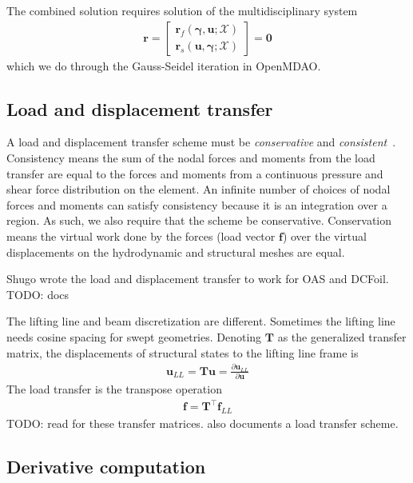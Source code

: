 \documentclass[10pt]{article}
\newcommand{\pp}[2]{\frac{\partial #1}{\partial #2}}
\newcommand{\mb}[1]{\boldsymbol{\mathbf{#1}}} %
\newcommand{\mbf}[1]{\mathbf{#1}}
\newcommand{\mbs}[1]{\boldsymbol{#1}}
\newcommand{\mcal}[1]{\mathcal{#1}} %
\newcommand{\beq}{\begin{equation}\begin{aligned}}
\newcommand{\eeq}{\end{aligned}\end{equation}}
\begin{document}
The combined solution requires solution of the multidisciplinary system
\beq
\mbf{r} = \begin{bmatrix}
	\mbf{r}_f(\mbs{\gamma}, \mbf{u}; \mcal{X}) \\
	\mbf{r}_s(\mbf{u}, \mbs{\gamma}; \mcal{X})
\end{bmatrix}
=
\mbf{0}
\eeq
which we do through the Gauss-Seidel iteration in OpenMDAO. %

\subsection{Load and displacement transfer}

A load and displacement transfer scheme must be \emph{conservative} and \emph{consistent}~\cite{Martins2005c}.
Consistency means the sum of the nodal forces and moments from the load transfer are equal to the forces and moments from a continuous pressure and shear force distribution on the element.
An infinite number of choices of nodal forces and moments can satisfy consistency because it is an integration over a region.
As such, we also require that the scheme be conservative.
Conservation means the virtual work done by the forces (load vector $\mb{f}$) over the virtual displacements on the hydrodynamic and structural meshes are equal.

Shugo wrote the load and displacement transfer to work for OAS and DCFoil.
TODO: docs 

The lifting line and beam discretization are different.
Sometimes the lifting line needs cosine spacing for swept geometries.
Denoting $\mb{T}$ as the generalized transfer matrix, the displacements of structural states to the lifting line frame is
\beq
\mb{u}_{LL} = \mb{T} \mb{u} = \pp{\mb{u}_{LL}}{\mb{u}}
\eeq
The load transfer is the transpose operation
\beq
\mb{f} = \mb{T}^\top \mb{f}_{LL}
\eeq
TODO: read \citet{Kenway2014a} for these transfer matrices.
\citet{Martins2005c} also documents a load transfer scheme.

\subsection{Derivative computation}
% 
\end{document}
